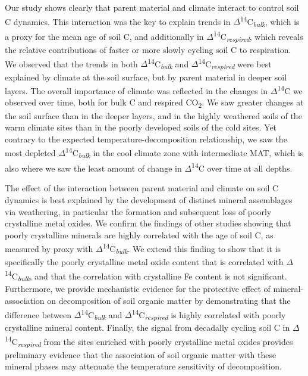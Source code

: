 \documentclass[english,man,floatsintext]{apa6}
\begin{document}
Our study shows clearly that parent material and climate interact to control soil C dynamics. This interaction was the key to explain trends in \(\Delta\)\textsuperscript{14}C\textsubscript{\emph{bulk}}, which is a proxy for the mean age of soil C, and additionally in \(\Delta\)\textsuperscript{14}C\textsubscript{\emph{respired}}, which reveals the relative contributions of faster or more slowly cycling soil C to respiration. We observed that the trends in both \(\Delta\)\textsuperscript{14}C\textsubscript{\emph{bulk}} and \(\Delta\)\textsuperscript{14}C\textsubscript{\emph{respired}} were best explained by climate at the soil surface, but by parent material in deeper soil layers. The overall importance of climate was reflected in the changes in \(\Delta\)\textsuperscript{14}C we observed over time, both for bulk C and respired CO\textsubscript{2}. We saw greater changes at the soil surface than in the deeper layers, and in the highly weathered soils of the warm climate sites than in the poorly developed soils of the cold sites. Yet contrary to the expected temperature-decomposition relationship, we saw the most depleted \(\Delta\)\textsuperscript{14}C\textsubscript{\emph{bulk}} in the cool climate zone with intermediate MAT, which is also where we saw the least amount of change in \(\Delta\)\textsuperscript{14}C over time at all depths.

The effect of the interaction between parent material and climate on soil C dynamics is best explained by the development of distinct mineral assemblages via weathering, in particular the formation and subsequent loss of poorly crystalline metal oxides. We confirm the findings of other studies showing that poorly crystalline minerals are highly correlated with the age of soil C, as measured by proxy with \(\Delta\)\textsuperscript{14}C\textsubscript{\emph{bulk}}. We extend this finding to show that it is specifically the poorly crystalline metal oxide content that is correlated with \(\Delta\)\textsuperscript{14}C\textsubscript{\emph{bulk}}, and that the correlation with crystalline Fe content is not significant. Furthermore, we provide mechanistic evidence for the protective effect of mineral-association on decomposition of soil organic matter by demonstrating that the difference between \(\Delta\)\textsuperscript{14}C\textsubscript{\emph{bulk}} and \(\Delta\)\textsuperscript{14}C\textsubscript{\emph{respired}} is highly correlated with poorly crystalline mineral content. Finally, the signal from decadally cycling soil C in \(\Delta\)\textsuperscript{14}C\textsubscript{\emph{respired}} from the sites enriched with poorly crystalline metal oxides provides preliminary evidence that the association of soil organic matter with these mineral phases may attenuate the temperature sensitivity of decomposition.
\end{document}
